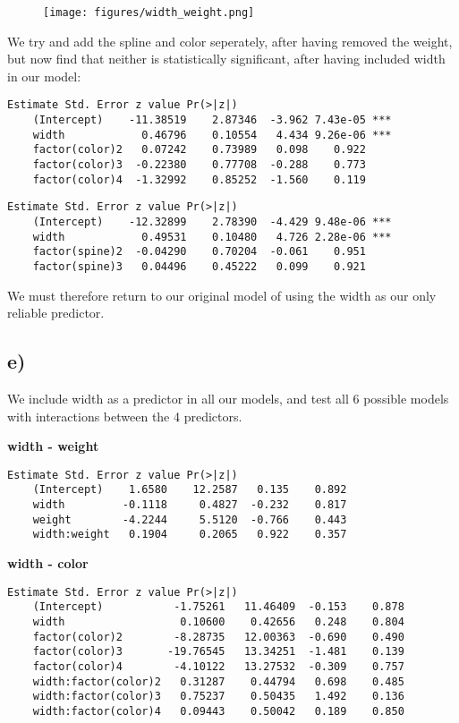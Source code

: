\documentclass[a4paper, twocolumn]{article}
\begin{document}
\begin{figure}
    \texttt{[image: figures/width\_weight.png]}
    \caption{}
    \label{fig:width_weight}
\end{figure}

We try and add the spline and color seperately, after having removed the weight, but now find that neither is statistically significant, after having included width in our model:
\begin{Verbatim}[fontsize=\scriptsize]
                    Estimate Std. Error z value Pr(>|z|)    
    (Intercept)    -11.38519    2.87346  -3.962 7.43e-05 ***
    width            0.46796    0.10554   4.434 9.26e-06 ***
    factor(color)2   0.07242    0.73989   0.098    0.922    
    factor(color)3  -0.22380    0.77708  -0.288    0.773    
    factor(color)4  -1.32992    0.85252  -1.560    0.119    
\end{Verbatim}

\begin{Verbatim}[fontsize=\scriptsize]
                    Estimate Std. Error z value Pr(>|z|)    
    (Intercept)    -12.32899    2.78390  -4.429 9.48e-06 ***
    width            0.49531    0.10480   4.726 2.28e-06 ***
    factor(spine)2  -0.04290    0.70204  -0.061    0.951    
    factor(spine)3   0.04496    0.45222   0.099    0.921    
\end{Verbatim}

We must therefore return to our original model of using the width as our only reliable predictor.


\subsection*{e)}
We include width as a predictor in all our models, and test all 6 possible models with interactions between the 4 predictors.

\textbf{width - weight}
\begin{Verbatim}[fontsize=\scriptsize]
                    Estimate Std. Error z value Pr(>|z|)    
    (Intercept)    1.6580    12.2587   0.135    0.892
    width         -0.1118     0.4827  -0.232    0.817
    weight        -4.2244     5.5120  -0.766    0.443
    width:weight   0.1904     0.2065   0.922    0.357
\end{Verbatim}

\textbf{width - color}
\begin{Verbatim}[fontsize=\scriptsize]
    Estimate Std. Error z value Pr(>|z|)    
    (Intercept)           -1.75261   11.46409  -0.153    0.878
    width                  0.10600    0.42656   0.248    0.804
    factor(color)2        -8.28735   12.00363  -0.690    0.490
    factor(color)3       -19.76545   13.34251  -1.481    0.139
    factor(color)4        -4.10122   13.27532  -0.309    0.757
    width:factor(color)2   0.31287    0.44794   0.698    0.485
    width:factor(color)3   0.75237    0.50435   1.492    0.136
    width:factor(color)4   0.09443    0.50042   0.189    0.850
\end{Verbatim}
\end{document}
